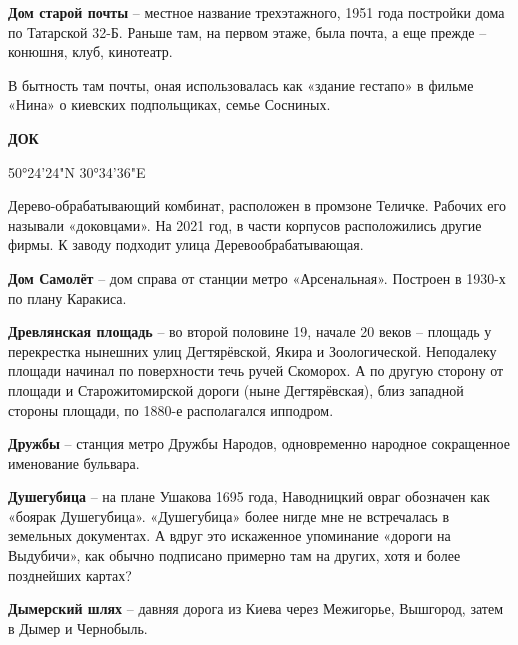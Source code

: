 \medskip

\textbf{Дом старой почты} – местное название трехэтажного, 1951 года постройки дома по Татарской 32-Б. Раньше там, на первом этаже, была почта, а еще прежде – конюшня, клуб, кинотеатр.

В бытность там почты, оная использовалась как «здание гестапо» в фильме «Нина» о киевских подпольщиках, семье Сосниных.\\

\medskip

\textbf{ДОК}

50°24'24"N 30°34'36"E

Дерево-обрабатывающий комбинат, расположен в промзоне Теличке. Рабочих его называли «доковцами». На 2021 год, в части корпусов расположились другие фирмы. К заводу подходит улица Деревообрабатывающая.\\

\medskip

\textbf{Дом Самолёт} – дом справа от станции метро «Арсенальная». Построен в 1930-х по плану Каракиса.\\

\medskip

\textbf{Древлянская площадь} – во второй половине 19, начале 20 веков – площадь у перекрестка нынешних улиц Дегтярёвской, Якира и Зоологической. Неподалеку площади начинал по поверхности течь ручей Скоморох. А по другую сторону от площади и Старожитомирской дороги (ныне Дегтярёвская), близ западной стороны площади, по 1880-е располагался ипподром.\\

\medskip

\textbf{Дружбы} – станция метро Дружбы Народов, одновременно народное сокращенное именование бульвара.\\

\medskip

\textbf{Душегубица} – на плане Ушакова 1695 года, Наводницкий овраг обозначен как «боярак Душегубица». «Душегубица» более нигде мне не встречалась в земельных документах. А вдруг это искаженное упоминание «дороги на Выдубичи», как обычно подписано примерно там на других, хотя и более позднейших картах?\\

\medskip

\textbf{Дымерский шлях} – давняя дорога из Киева через Межигорье, Вышгород, затем в Дымер и Чернобыль.

